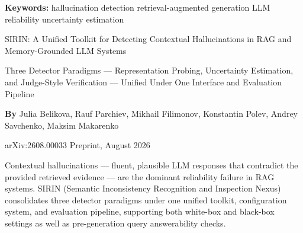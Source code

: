 \documentclass[10pt,twocolumn]{article}
\begin{document}
\setlength{\parindent}{0pt}
\setlength{\parskip}{4pt}

{\small\color{keywordgray}\textbf{Keywords:}
  hallucination detection \textbullet{}
  retrieval-augmented generation \textbullet{}
  LLM reliability \textbullet{}
  uncertainty estimation}\par\vspace{4pt}

{\LARGE\bfseries\raggedright
  SIRIN: A Unified Toolkit for Detecting
  Contextual Hallucinations in RAG
  and Memory-Grounded LLM Systems}\par\vspace{4pt}

{\large\itshape\raggedright
  Three Detector Paradigms --- Representation Probing, Uncertainty Estimation,
  and Judge-Style Verification --- Unified Under One Interface and Evaluation Pipeline}\par\vspace{6pt}

{\small\textbf{By} Julia Belikova, Rauf Parchiev, Mikhail Filimonov,
  Konstantin Polev, Andrey Savchenko, Maksim Makarenko}\par\vspace{2pt}

{\small\color{keywordgray}arXiv:2608.00033 \textbullet{} Preprint, August 2026}
\par\vspace{2pt}\noindent{\color{rulered}\rule{\columnwidth}{0.6pt}}\vspace{6pt}

Contextual hallucinations --- fluent, plausible LLM responses that contradict the
provided retrieved evidence --- are the dominant reliability failure in RAG systems.
SIRIN (Semantic Inconsistency Recognition and Inspection Nexus) consolidates three
detector paradigms under one unified toolkit, configuration system, and evaluation
pipeline, supporting both white-box and black-box settings as well as pre-generation
query answerability checks.
\end{document}
